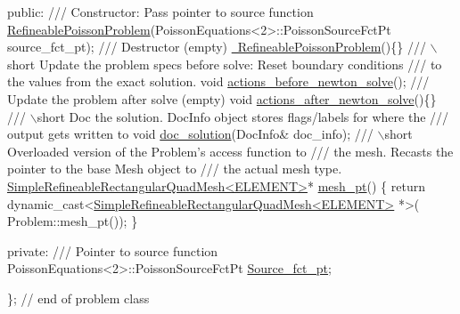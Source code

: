 \begin{DoxyCodeInclude}
\textcolor{keyword}{public}:
\textcolor{comment}{}
\textcolor{comment}{ /// Constructor: Pass pointer to source function}
\textcolor{comment}{} \hyperlink{classRefineablePoissonProblem_a019ec586c38163e04e177de92503c02f}{RefineablePoissonProblem}(PoissonEquations<2>::PoissonSourceFctPt 
                          source\_fct\_pt);
\textcolor{comment}{}
\textcolor{comment}{ /// Destructor (empty)}
\textcolor{comment}{} \hyperlink{classRefineablePoissonProblem_a84980680d8a6576e14af42a8639d391a}{~RefineablePoissonProblem}()\{\}
\textcolor{comment}{}
\textcolor{comment}{ /// \(\backslash\)short Update the problem specs before solve: Reset boundary conditions}
\textcolor{comment}{ /// to the values from the exact solution.}
\textcolor{comment}{} \textcolor{keywordtype}{void} \hyperlink{classRefineablePoissonProblem_a883906ab6c06ffa10ed55dc4fc02ce96}{actions\_before\_newton\_solve}();
\textcolor{comment}{}
\textcolor{comment}{ /// Update the problem after solve (empty)}
\textcolor{comment}{} \textcolor{keywordtype}{void} \hyperlink{classRefineablePoissonProblem_ac4d433dad09bce5bd9be21e86d347e38}{actions\_after\_newton\_solve}()\{\}
\textcolor{comment}{}
\textcolor{comment}{ /// \(\backslash\)short Doc the solution. DocInfo object stores flags/labels for where the}
\textcolor{comment}{ /// output gets written to}
\textcolor{comment}{} \textcolor{keywordtype}{void} \hyperlink{classRefineablePoissonProblem_aaf9482084473a6ca2bd0de24acae08e9}{doc\_solution}(DocInfo& doc\_info);
\textcolor{comment}{}
\textcolor{comment}{ /// \(\backslash\)short Overloaded version of the Problem's access function to }
\textcolor{comment}{ /// the mesh. Recasts the pointer to the base Mesh object to }
\textcolor{comment}{ /// the actual mesh type.}
\textcolor{comment}{} \hyperlink{classSimpleRefineableRectangularQuadMesh}{SimpleRefineableRectangularQuadMesh<ELEMENT>}* 
      \hyperlink{classRefineablePoissonProblem_ad8148aada59e279cbd9eb34272b65fa5}{mesh\_pt}() 
  \{
   \textcolor{keywordflow}{return} \textcolor{keyword}{dynamic\_cast<}\hyperlink{classSimpleRefineableRectangularQuadMesh}{SimpleRefineableRectangularQuadMesh<ELEMENT>}
      *\textcolor{keyword}{>}(
    Problem::mesh\_pt());
  \}

\textcolor{keyword}{private}:
\textcolor{comment}{}
\textcolor{comment}{ /// Pointer to source function}
\textcolor{comment}{} PoissonEquations<2>::PoissonSourceFctPt \hyperlink{classRefineablePoissonProblem_abaf852221a8673550f96bbb507d6b05a}{Source\_fct\_pt};

\}; \textcolor{comment}{// end of problem class}

\end{DoxyCodeInclude}


